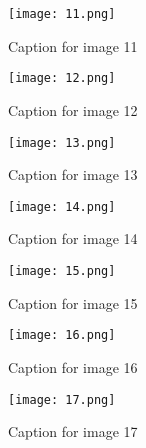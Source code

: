 \begin{figure}[htbp]
    \centering
    \texttt{[image: 11.png]}
    \caption{Caption for image 11}
    \label{fig:image11}
\end{figure}

\begin{figure}[htbp]
    \centering
    \texttt{[image: 12.png]}
    \caption{Caption for image 12}
    \label{fig:image12}
\end{figure}

\begin{figure}[htbp]
    \centering
    \texttt{[image: 13.png]}
    \caption{Caption for image 13}
    \label{fig:image13}
\end{figure}

\begin{figure}[htbp]
    \centering
    \texttt{[image: 14.png]}
    \caption{Caption for image 14}
    \label{fig:image14}
\end{figure}

\begin{figure}[htbp]
    \centering
    \texttt{[image: 15.png]}
    \caption{Caption for image 15}
    \label{fig:image15}
\end{figure}

\begin{figure}[htbp]
    \centering
    \texttt{[image: 16.png]}
    \caption{Caption for image 16}
    \label{fig:image16}
\end{figure}

\begin{figure}[htbp]
    \centering
    \texttt{[image: 17.png]}
    \caption{Caption for image 17}
    \label{fig:image17}
\end{figure}
